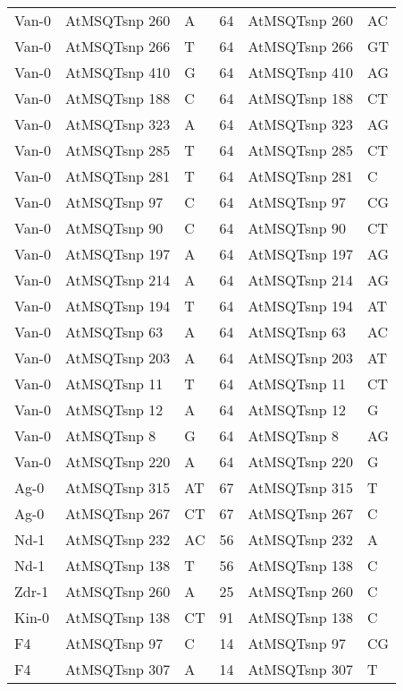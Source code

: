 \begin{center}
\begin{longtable}{|l|l|l|l|l|l|}
Van-0&AtMSQTsnp 260&A&64&AtMSQTsnp 260&AC\\
Van-0&AtMSQTsnp 266&T&64&AtMSQTsnp 266&GT\\
Van-0&AtMSQTsnp 410&G&64&AtMSQTsnp 410&AG\\
Van-0&AtMSQTsnp 188&C&64&AtMSQTsnp 188&CT\\
Van-0&AtMSQTsnp 323&A&64&AtMSQTsnp 323&AG\\
Van-0&AtMSQTsnp 285&T&64&AtMSQTsnp 285&CT\\
Van-0&AtMSQTsnp 281&T&64&AtMSQTsnp 281&C\\
Van-0&AtMSQTsnp 97&C&64&AtMSQTsnp 97&CG\\
Van-0&AtMSQTsnp 90&C&64&AtMSQTsnp 90&CT\\
Van-0&AtMSQTsnp 197&A&64&AtMSQTsnp 197&AG\\
Van-0&AtMSQTsnp 214&A&64&AtMSQTsnp 214&AG\\
Van-0&AtMSQTsnp 194&T&64&AtMSQTsnp 194&AT\\
Van-0&AtMSQTsnp 63&A&64&AtMSQTsnp 63&AC\\
Van-0&AtMSQTsnp 203&A&64&AtMSQTsnp 203&AT\\
Van-0&AtMSQTsnp 11&T&64&AtMSQTsnp 11&CT\\
Van-0&AtMSQTsnp 12&A&64&AtMSQTsnp 12&G\\
Van-0&AtMSQTsnp 8&G&64&AtMSQTsnp 8&AG\\
Van-0&AtMSQTsnp 220&A&64&AtMSQTsnp 220&G\\
Ag-0&AtMSQTsnp 315&AT&67&AtMSQTsnp 315&T\\
Ag-0&AtMSQTsnp 267&CT&67&AtMSQTsnp 267&C\\
Nd-1&AtMSQTsnp 232&AC&56&AtMSQTsnp 232&A\\
Nd-1&AtMSQTsnp 138&T&56&AtMSQTsnp 138&C\\
Zdr-1&AtMSQTsnp 260&A&25&AtMSQTsnp 260&C\\
Kin-0&AtMSQTsnp 138&CT&91&AtMSQTsnp 138&C\\
F4&AtMSQTsnp 97&C&14&AtMSQTsnp 97&CG\\
F4&AtMSQTsnp 307&A&14&AtMSQTsnp 307&T\\
\hline
\end{longtable}
\end{center}

